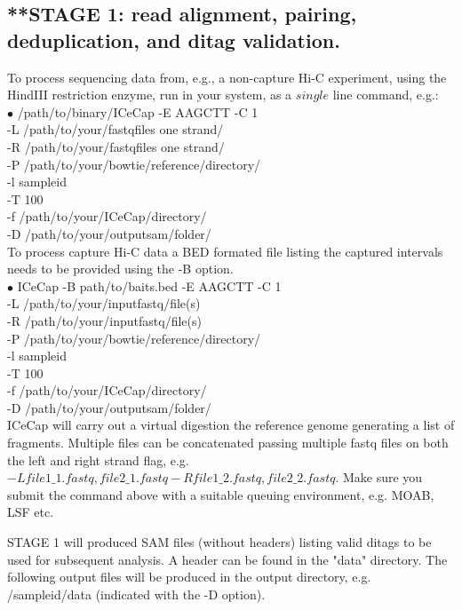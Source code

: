 \documentclass[10pt,a4paper]{article}
\begin{document}
\subsection{**STAGE 1: read alignment, pairing, deduplication, and ditag validation.}

\vspace*{1cm}
To process sequencing data from, e.g., a non-capture Hi-C experiment, using the HindIII restriction enzyme, run in your system, as a $single$ line command, e.g.:\\

$\bullet$ /path/to/binary/ICeCap -E AAGCTT -C 1 \\
-L /path/to/your/fastqfiles one strand/ \\
-R /path/to/your/fastqfiles one strand/ \\
-P /path/to/your/bowtie/reference/directory/ \\
-l sampleid \\
-T 100 \\
-f /path/to/your/ICeCap/directory/ \\
-D /path/to/your/outputsam/folder/ \\

To process capture Hi-C data a BED formated file listing the captured intervals needs to be provided using the -B option. \\

$\bullet$ ICeCap -B path/to/baits.bed -E AAGCTT -C 1  \\
-L /path/to/your/inputfastq/file(s)  \\
-R /path/to/your/inputfastq/file(s)  \\
-P /path/to/your/bowtie/reference/directory/ \\
-l sampleid \\
-T 100 \\
-f /path/to/your/ICeCap/directory/ \\
-D /path/to/your/outputsam/folder/ \\

ICeCap will carry out a virtual digestion the reference genome generating a list of fragments.
Multiple files can be concatenated passing multiple fastq files on both the left and right strand flag, e.g. $-L file1\_1.fastq,file2\_1.fastq -R file1\_2.fastq,file2\_2.fastq$.
Make sure you submit the command above with a suitable queuing environment, e.g. MOAB, LSF etc.

STAGE 1 will produced SAM files (without headers) listing valid ditags to be used for subsequent analysis.  A header can be found in the "data" directory.
The following output files will be produced in the output directory, e.g. /sampleid/data (indicated with the -D option).
\end{document}
